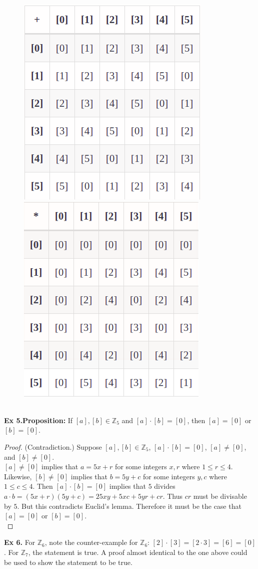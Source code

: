\documentclass{article}
\begin{document}
\begin{figure}[h]
\centering
\includegraphics[scale=0.6]{11_5_4a.png}
\includegraphics[scale=0.6]{11_5_4b.png}
\end{figure}\\
\noindent\textbf{Ex 5.Proposition:} If $[a],[b] \in \mathbb{Z}_5$ and $[a] \cdot{} [b] = [0]$, then $[a]=[0]$ or $[b] = [0]$.
\begin{proof}
(Contradiction.) Suppose $[a],[b] \in \mathbb{Z}_5$, $[a] \cdot{} [b] = [0]$, $[a] \neq [0]$, and $[b] \neq [0]$.\\
$[a] \neq [0]$ implies that $a = 5x+r$ for some integers $x, r$ where $1 \leq r \leq 4$. Likewise, $[b] \neq [0]$ implies that $b=5y+c$ for some integers $y, c$ where $1 \leq c \leq 4$. Then $[a] \cdot{} [b] = [0]$ implies that $5$ divides $a \cdot{} b = (5x+r)(5y+c)=25xy+5xc+5yr+cr$. Thus $cr$ must be divisable by $5$. But this contradicts Euclid's lemma. Therefore it must be the case that $[a]=[0]$ or $[b]=[0]$.\\ 
\end{proof}
\noindent\textbf{Ex 6.} For $\mathbb{Z}_6$, note the counter-example for $\mathbb{Z}_6$: $[2] \cdot{} [3] = [2 \cdot{} 3] = [6] = [0]$. For $\mathbb{Z}_7$, the statement is true. A proof almost identical to the one above could be used to show the statement to be true.\\
\end{document}
